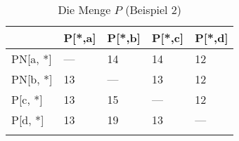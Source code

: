 
\begin{longtable}[c]{|l|l|l|l|l|}
\hline
             & P{[}*,a{]} & P{[}*,b{]} & P{[}*,c{]} & P{[}*,d{]} \\ \hline
\endfirsthead
%
\endhead
%
PN{[}a, *{]} & ---        & 14         & 14         & 12         \\ \hline
PN{[}b, *{]} & 13         & ---        & 13         & 12         \\ \hline
P{[}c, *{]}  & 13         & 15         & ---        & 12         \\ \hline
P{[}d, *{]}  & 13         & 19         & 13         & ---        \\ \hline
\caption{Die Menge $P$ (Beispiel 2)}
\label{beispiel2p}\\
\end{longtable}